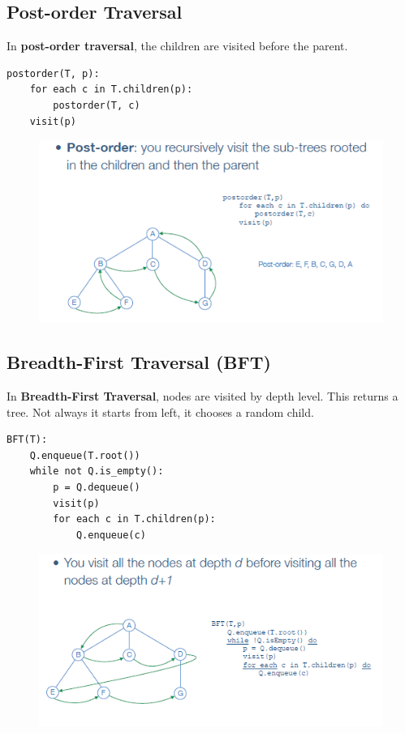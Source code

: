 \subsection{Post-order Traversal}
In \textbf{post-order traversal}, the children are visited before the parent.
\begin{verbatim}
postorder(T, p):
    for each c in T.children(p):
        postorder(T, c)
    visit(p)
\end{verbatim}
\begin{figure}[h!]
    \centering
    \includegraphics[width=0.75\linewidth]{immagini/tree2.png}
\end{figure}
\newpage
\subsection{Breadth-First Traversal (BFT)}
In \textbf{Breadth-First Traversal}, nodes are visited by depth level. This returns a tree. Not always it starts from left, it chooses a random child.
\begin{verbatim}
BFT(T):
    Q.enqueue(T.root())
    while not Q.is_empty():
        p = Q.dequeue()
        visit(p)
        for each c in T.children(p):
            Q.enqueue(c)
\end{verbatim}
\begin{figure}[h!]
    \centering
    \includegraphics[width=0.75\linewidth]{immagini/tree3.png}
\end{figure}

